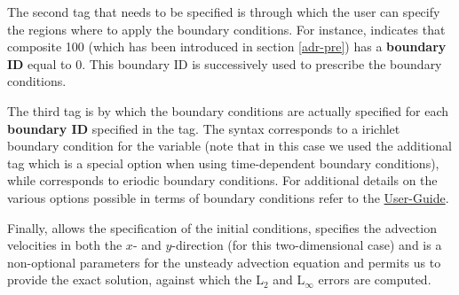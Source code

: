 The second tag that needs to be specified is  through 
which the user can specify the regions where to apply the boundary conditions. 
For instance,  indicates that composite 100 (which 
has been introduced in section \ref{adr-pre}) has a \textbf{boundary ID} equal 
to 0. This boundary ID is successively used to prescribe the boundary conditions.

The third tag is  by which the boundary conditions 
are actually specified for each \textbf{boundary ID} specified in the  
tag. The syntax  corresponds to a irichlet boundary 
condition for the variable  (note that in this case we used the additional 
tag  which is a special option 
when using time-dependent boundary conditions), while  
corresponds to eriodic boundary conditions. For additional details 
on the various options possible in terms of boundary conditions refer to 
the \href{http://www.nektar.info/downloads/8}{User-Guide}.

Finally,  allows the specification 
of the initial conditions,  specifies 
the advection velocities in both the $x$- and $y$-direction (for this two-dimensional 
case) and is a non-optional parameters for the unsteady advection equation 
and  permits us to provide the 
exact solution, against which the L$_{2}$ and L$_{\infty}$ errors are computed.

